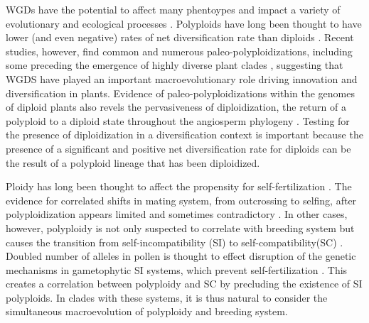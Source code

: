 WGDs have the potential to affect many phentoypes and impact a variety of evolutionary \citep{ramsey_2002} and ecological processes \citep{sessa_2019}.
Polyploids have long been thought to have lower (and even negative) rates of net diversification rate than diploids \citep{mayrose_2011, mayrose_2015}. 
Recent studies, however, find common and numerous paleo-polyploidizations, including some preceding the emergence of highly diverse plant clades \citep{soltis_2014, landis_2018}, suggesting that WGDS have played an important macroevolutionary role driving innovation and diversification in plants.
Evidence of paleo-polyploidizations within the genomes of diploid plants also revels the pervasiveness of diploidization, the return of a polyploid to a diploid state throughout the angiosperm phylogeny \citep{soltis_2015diploidization, dodsworth_2015}. Testing for the presence of diploidization in a diversification context is important because the presence of a significant and positive net diversification rate for diploids can be  the result of a polyploid lineage that has been diploidized. %

Ploidy has long been thought to affect the propensity for self-fertilization \citep{stebbins1950}. 
The evidence for correlated shifts in mating system, from outcrossing to selfing, after polyploidization appears limited and sometimes contradictory \citep{barringer2007, barrett2008, husband2008}.
In other cases, however, polyploidy is not only suspected to correlate with breeding system but causes the transition from self-incompatibility (SI) to self-compatibility(SC) \citep{stout1942, lewis1947}.
Doubled number of alleles in pollen is thought to effect disruption of the genetic mechanisms in gametophytic SI systems, which prevent self-fertilization \citep{entani1999, tsukamoto2005, kubo2010}. 
This creates a correlation between polyploidy and SC by precluding the existence of SI polyploids.
In clades with these systems, it is thus natural to consider the simultaneous macroevolution of polyploidy and breeding system.

